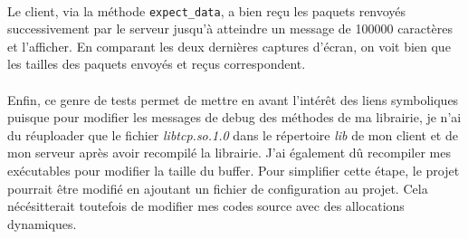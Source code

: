 \documentclass{article}
\begin{document}
    \paragraph{}
    Le client, via la méthode \texttt{expect\_data}, a bien reçu les paquets renvoyés successivement par le serveur jusqu'à atteindre un message de 100000 caractères et l'afficher. En comparant les deux dernières captures d'écran, on voit bien que les tailles des paquets envoyés et reçus correspondent.

    \paragraph{}
    Enfin, ce genre de tests permet de mettre en avant l'intérêt des liens symboliques puisque pour modifier les messages de debug des méthodes de ma librairie, je n'ai du réuploader que le fichier \emph{libtcp.so.1.0} dans le répertoire \emph{lib} de mon client et de mon serveur après avoir recompilé la librairie. J'ai également dû recompiler mes exécutables pour modifier la taille du buffer. Pour simplifier cette étape, le projet pourrait être modifié en ajoutant un fichier de configuration au projet. Cela nécésitterait toutefois de modifier mes codes source avec des allocations dynamiques.
\end{document}
